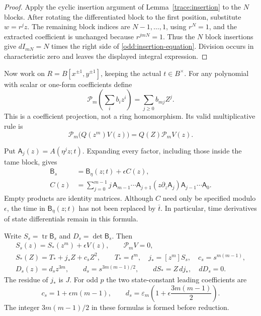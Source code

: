 \begin{proof}
Apply the cyclic insertion argument of Lemma~\ref{trace:insertion}
to the $N$ blocks. After rotating the differentiated block to the
first position, substitute $w=r^jz$. The remaining block indices
are $N-1,\ldots,1$, using $r^N=1$, and the extracted coefficient
is unchanged because $r^{jmN}=1$. Thus the $N$ block insertions
give $dI_{mN}=N$ times the right side of
\eqref{odd:insertion-equation}. Division occurs in characteristic
zero and leaves the displayed integral expression.
\end{proof}

Now work on $R=B[x^{\pm1},y^{\pm1}]$, keeping the actual
$t\in B^\times$. For any polynomial with scalar or one-form
coefficients define
\begin{equation}
 \mathcal P_m\left(\sum_i b_i z^i\right)=\sum_{j\ge0}b_{mj}Z^j.
 \label{odd:projection-definition}
\end{equation}
This is a coefficient projection, not a ring homomorphism. Its
valid multiplicative rule is
\begin{equation}
 \mathcal P_m\bigl(Q(z^m)V(z)\bigr)=Q(Z)\mathcal P_m V(z).
 \label{odd:projection-rule}
\end{equation}

Put $\mathsf A_j(z)=A(\eta^jz;t)$. Expanding every factor, including
those inside the tame block, gives
\begin{equation}
 \begin{split}
 \mathsf B_s&=\mathsf B_\eta(z;t)+\epsilon C(z),\\
 C(z)&=\sum_{j=0}^{m-1}j\,
 \mathsf A_{m-1}\cdots\mathsf A_{j+1}
 (z\partial_z\mathsf A_j)
 \mathsf A_{j-1}\cdots\mathsf A_0.
 \end{split}
 \label{odd:block-variation}
\end{equation}
Empty products are identity matrices. Although $C$ need only be
specified modulo $\epsilon$, the time in $\mathsf B_\eta(z;t)$
has not been replaced by $\bar t$. In particular, time derivatives
of state differentials remain in this formula.

\begin{lemma}
\label{odd:block-trace}
Write $S_s=\operatorname{tr}\mathsf B_s$ and
$D_s=\det\mathsf B_s$. Then
\begin{equation}
 \begin{gathered}
 S_s(z)=S_*(z^m)+\epsilon V(z),\qquad \mathcal P_m V=0,\\
 S_*(Z)=T_*+j_*Z+c_sZ^2,\qquad
 T_*=t^m,\quad j_*=[z^m]S_s,\quad c_s=s^{m(m-1)},\\
 D_s(z)=d_s z^{3m},\qquad
 d_s=s^{3m(m-1)/2},\qquad
 dS_*=Z\,dj_*,\quad dD_s=0.
 \end{gathered}
 \label{odd:deformed-trace}
\end{equation}
The residue of $j_*$ is $J$. For odd $p$ the two state-constant
leading coefficients are
\begin{equation}
 c_s=1+\epsilon m(m-1),\qquad
 d_s=\varepsilon_m\left(1+\epsilon\frac{3m(m-1)}2\right).
 \label{odd:leading-jets}
\end{equation}
The integer $3m(m-1)/2$ in these formulas is formed before reduction.
\end{lemma}

